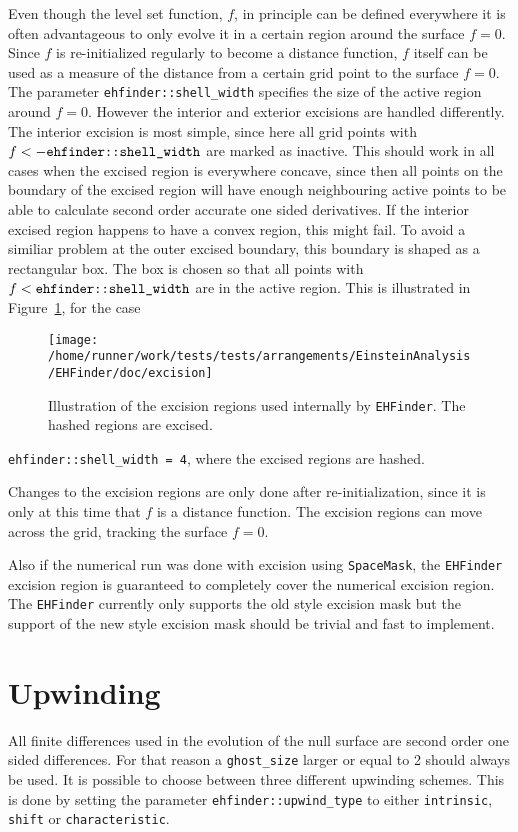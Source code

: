 Even though the level set function, $f$, in principle can be defined
everywhere it is often advantageous to only evolve it in a certain region
around the surface $f=0$. Since $f$ is re-initialized regularly to become
a distance function, $f$ itself can be used as a measure of the distance
from a certain grid point to the surface $f=0$. The parameter
{\tt ehfinder::shell\_width} specifies the size of the active region
around $f=0$. However the interior and exterior excisions are handled
differently. The interior excision is most simple, since here all grid points
with $f<-{\mbox{\tt ehfinder::shell\_width}}$ are marked as inactive. This
should work in all cases when the excised region is everywhere concave, since
then all points on the boundary of the excised region will have enough
neighbouring active points to be able to calculate second order accurate one
sided derivatives. If the interior excised region happens to have a convex
region, this might fail. To avoid a similiar problem at the outer excised
boundary, this boundary is shaped as a rectangular box. The box is chosen
so that all points with $f<{\mbox{\tt ehfinder::shell\_width}}$ are in the
active region. This is illustrated in
Figure~\ref{AEIThorns_EHFinder_excisefig}, for the case
\begin{figure}[ht]
  \begin{center}
    \texttt{[image: /home/runner/work/tests/tests/arrangements/EinsteinAnalysis/EHFinder/doc/excision]}
  \end{center}
  \caption{Illustration of the excision regions used internally by
           {\tt EHFinder}. The hashed regions are excised.}
  \label{AEIThorns_EHFinder_excisefig}
\end{figure}
{\tt ehfinder::shell\_width = 4}, where the excised regions are hashed.

Changes to the excision regions are only done after re-initialization,
since it is only at this time that $f$ is a distance function. The excision
regions can move across the grid, tracking the surface $f=0$.

Also if the numerical run was done with excision using {\tt SpaceMask},
the {\tt EHFinder} excision region is guaranteed to completely cover the 
numerical excision region. The {\tt EHFinder} currently only supports the
old style excision mask but the support of the new style excision mask
should be trivial and fast to implement.
\section{Upwinding}
\label{AEIThorns_EHFinder_upwind}
All finite differences used in the evolution of the null surface are second
order one sided differences. For that reason a {\tt ghost\_size} larger or
equal to 2 should always be used. It is possible to choose between three
different upwinding schemes. This is done by setting the parameter
{\tt ehfinder::upwind\_type} to either {\tt intrinsic}, {\tt shift} or
{\tt characteristic}.

